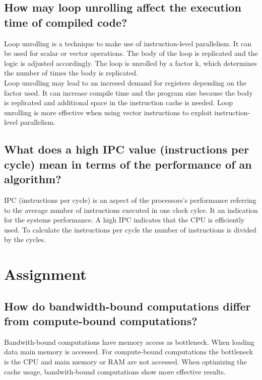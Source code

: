 \documentclass[runningheads]{llncs}
\begin{document}
\subsection{How may loop unrolling affect the execution time of compiled code?}
Loop unrolling is a technique to make use of instruction-level parallelism.
It can be used for scalar or vector operations.
The body of the loop is replicated and the logic is adjusted accordingly. 
The loop is unrolled by a factor k, which determines the number of times the body is replicated.
\\
Loop unrolling may lead to an incresed demand for registers depending on the factor used. 
It can increase compile time and the program size because the body is replicated and additional space in the instruction cache is needed.
Loop unrolling is more effective when using vector instructions to exploit instruction-level parallelism.

\subsection{What does a high IPC value (instructions per cycle) mean in terms of the performance of an algorithm?}
IPC (instructions per cycle) is an aspect of the processors's performance referring to the average number of instructions
executed in one clock cylce. It an indication for the systems performance. 
A high IPC indicates that the CPU is efficiently used.
To calculate the instructions per cycle the number of instructions is divided by the cycles.

\section{Assignment}

\subsection{How do bandwidth-bound computations differ from compute-bound computations?}
Bandwith-bound computations have memory access as bottleneck. When loading data main memory is accessed.
For compute-bound computations the bottleneck is the CPU and main memory or RAM are not accessed.
When optimizing the cache usage, bandwith-bound computations show more effective results. 

\end{document}
